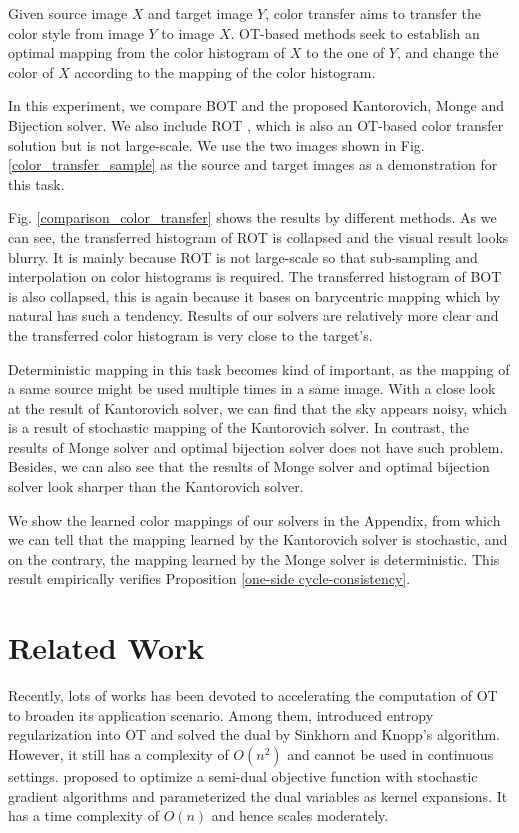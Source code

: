 \documentclass[runningheads]{llncs}
\begin{document}
Given source image $X$ and target image $Y$, color transfer aims to transfer the color style from image $Y$ to image $X$. OT-based methods seek to establish an optimal mapping from the color histogram of $X$ to the one of $Y$, and change the color of $X$ according to the mapping of the color histogram. 

In this experiment, we compare BOT \cite{large-scale} and the proposed Kantorovich, Monge and Bijection solver. We also include ROT \cite{ferradans2014regularized}, which is also an OT-based color transfer solution but is not large-scale. We use the two images shown in Fig. \ref{color_transfer_sample} as the source and target images as a demonstration for this task. 

Fig. \ref{comparison_color_transfer} shows the results by different methods. As we can see, the transferred histogram of ROT is collapsed and the visual result looks blurry. It is mainly because ROT is not large-scale so that sub-sampling and interpolation on color histograms is required. The transferred histogram of BOT is also collapsed, this is again because it bases on barycentric mapping which by natural has such a tendency. Results of our solvers are relatively more clear and the transferred color histogram is very close to the target's. 

Deterministic mapping in this task becomes kind of important, as the mapping of a same source might be used multiple times in a same image. With a close look at the result of Kantorovich solver, we can find that the sky appears noisy, which is a result of stochastic mapping of the Kantorovich solver. In contrast, the results of Monge solver and optimal bijection solver does not have such problem. Besides, we can also see that the results of Monge solver and optimal bijection solver look sharper than the Kantorovich solver. 

We show the learned color mappings of our solvers in the Appendix, from which we can tell that the mapping learned by the Kantorovich solver is stochastic, and on the contrary, the mapping learned by the Monge solver is deterministic. This result empirically verifies Proposition \ref{one-side cycle-consistency}. 

\section{Related Work}

Recently, lots of works has been devoted to accelerating the computation of OT to broaden its application scenario. Among them, \cite{sinkhorn} introduced entropy regularization into OT and solved the dual by Sinkhorn and Knopp's algorithm. However, it still has a complexity of $O(n^2)$ and cannot be used in continuous settings. \cite{largescale_semidual} proposed to optimize a semi-dual objective function with stochastic gradient algorithms and parameterized the dual variables as kernel expansions. It has a time complexity of $O(n)$ and hence scales moderately. 
\end{document}
